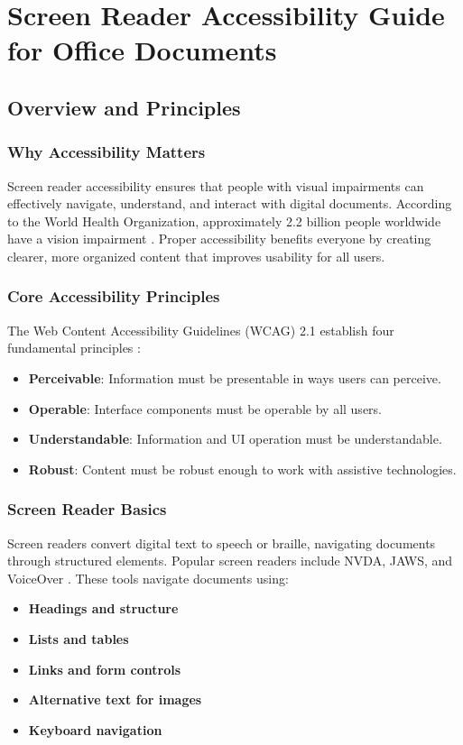 \chapter{Screen Reader Accessibility Guide for Office Documents}\label{ch15:office-accessibility}

\section{Overview and Principles}\label{ch15:sec:overview}

\subsection{Why Accessibility Matters}\label{ch15:ssec:why-matters}
Screen reader accessibility ensures that people with visual impairments can effectively navigate, understand, and interact with digital documents. According to the World Health Organization, approximately 2.2 billion people worldwide have a vision impairment \supercite{WHO2021}. Proper accessibility benefits everyone by creating clearer, more organized content that improves usability for all users.

\subsection{Core Accessibility Principles}\label{ch15:ssec:core-principles}
The Web Content Accessibility Guidelines (WCAG) 2.1 establish four fundamental principles \supercite{WCAG2018}:
\begin{itemize}
	\item \textbf{Perceivable}: Information must be presentable in ways users can perceive.
	\item \textbf{Operable}: Interface components must be operable by all users.
	\item \textbf{Understandable}: Information and UI operation must be understandable.
	\item \textbf{Robust}: Content must be robust enough to work with assistive technologies.
\end{itemize}

\subsection{Screen Reader Basics}\label{ch15:ssec:sr-basics}
Screen readers convert digital text to speech or braille, navigating documents through structured elements. Popular screen readers include NVDA, JAWS, and VoiceOver \supercite{NVDA2023, JAWS2023, VoiceOver2023}. These tools navigate documents using:
\begin{itemize}
	\item \textbf{Headings and structure}
	\item \textbf{Lists and tables}
	\item \textbf{Links and form controls}
	\item \textbf{Alternative text for images}
	\item \textbf{Keyboard navigation}
\end{itemize}

